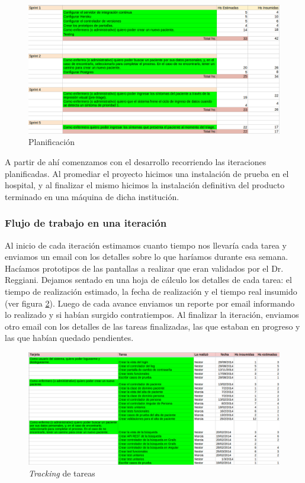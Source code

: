 \begin{figure}
  \centerline{\includegraphics[width=1.2\textwidth]{planificacion.png}}
  \caption{Planificación}
  \label{fig:planificacion}
\end{figure}

A partir de ahí comenzamos con el desarrollo recorriendo las iteraciones planificadas. Al promediar el proyecto hicimos una instalación de prueba en el hospital, y al finalizar el mismo hicimos la instalación definitiva del producto terminado en una máquina de dicha institución.

\subsubsection{Flujo de trabajo en una iteración}
Al inicio de cada iteración estimamos cuanto tiempo nos llevaría cada tarea y enviamos un email con los detalles sobre lo que haríamos durante esa semana. Hacíamos prototipos de las pantallas a realizar que eran validados por el Dr. Reggiani. Dejamos sentado en una hoja de cálculo los detalles de cada tarea: el tiempo de realización estimado, la fecha de realización y el tiempo real insumido (ver figura \ref{fig:tracking}). Luego de cada avance enviamos un reporte por email informando lo realizado y si habían surgido contratiempos. Al finalizar la iteración, enviamos otro email con los detalles de las tareas finalizadas, las que estaban en progreso y las que habían quedado pendientes.

\begin{figure}[h]
  \centerline{\includegraphics[width=1.2\textwidth]{tracking.png}}
  \caption{\textit{Tracking} de tareas}
  \label{fig:tracking}
\end{figure}

